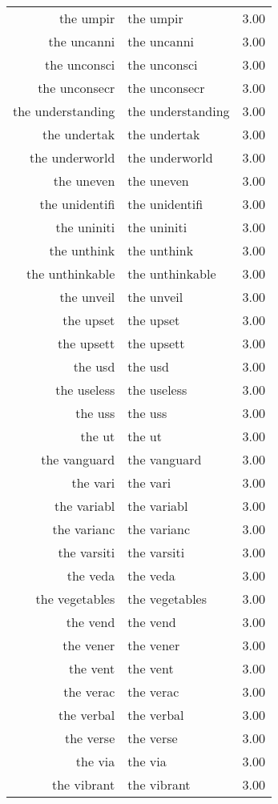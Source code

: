 \begin{table}[ht]
\begin{tabular}{rlr}
  the umpir & the umpir & 3.00 \\ 
  the uncanni & the uncanni & 3.00 \\ 
  the unconsci & the unconsci & 3.00 \\ 
  the unconsecr & the unconsecr & 3.00 \\ 
  the understanding & the understanding & 3.00 \\ 
  the undertak & the undertak & 3.00 \\ 
  the underworld & the underworld & 3.00 \\ 
  the uneven & the uneven & 3.00 \\ 
  the unidentifi & the unidentifi & 3.00 \\ 
  the uniniti & the uniniti & 3.00 \\ 
  the unthink & the unthink & 3.00 \\ 
  the unthinkable & the unthinkable & 3.00 \\ 
  the unveil & the unveil & 3.00 \\ 
  the upset & the upset & 3.00 \\ 
  the upsett & the upsett & 3.00 \\ 
  the usd & the usd & 3.00 \\ 
  the useless & the useless & 3.00 \\ 
  the uss & the uss & 3.00 \\ 
  the ut & the ut & 3.00 \\ 
  the vanguard & the vanguard & 3.00 \\ 
  the vari & the vari & 3.00 \\ 
  the variabl & the variabl & 3.00 \\ 
  the varianc & the varianc & 3.00 \\ 
  the varsiti & the varsiti & 3.00 \\ 
  the veda & the veda & 3.00 \\ 
  the vegetables & the vegetables & 3.00 \\ 
  the vend & the vend & 3.00 \\ 
  the vener & the vener & 3.00 \\ 
  the vent & the vent & 3.00 \\ 
  the verac & the verac & 3.00 \\ 
  the verbal & the verbal & 3.00 \\ 
  the verse & the verse & 3.00 \\ 
  the via & the via & 3.00 \\ 
  the vibrant & the vibrant & 3.00 \\ 

\end{tabular}
\end{table}
